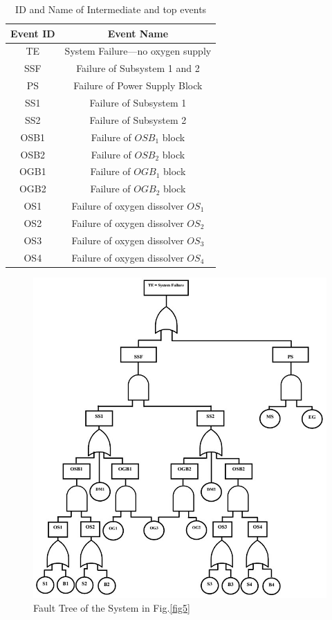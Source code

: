 \documentclass[10pt]{llncs}
\begin{document}
\begin{table}[thpb]
\renewcommand{\arraystretch}{1.3}
\caption{ID and Name of Intermediate and top events}
\label{table2}
\centering
\begin{tabular}{c c}
\hline
\bfseries Event ID & \bfseries Event Name\\
\hline
TE & System Failure---no oxygen supply\\
SSF & Failure of Subsystem 1 and 2\\
PS & Failure of Power Supply Block\\
SS1 & Failure of Subsystem 1\\
SS2 & Failure of Subsystem 2\\
OSB1 & Failure of ${OSB}_1$ block\\
OSB2 & Failure of ${OSB}_2$ block\\
OGB1 & Failure of ${OGB}_1$ block\\
OGB2& Failure of ${OGB}_2$ block\\
OS1 & Failure of oxygen dissolver $OS_1$ \\
OS2 & Failure of oxygen dissolver $OS_2$\\
OS3 & Failure of oxygen dissolver $OS_3$\\
OS4 & Failure of oxygen dissolver $OS_4$\\
\hline
\end{tabular}
\end{table}

\begin{figure}[thpb]
\centering
\includegraphics[scale=.65]{FTA_main}
\caption{Fault Tree of the System in Fig.\ref{fig5} }
\label{fig6}       %
\end{figure}
\end{document}
